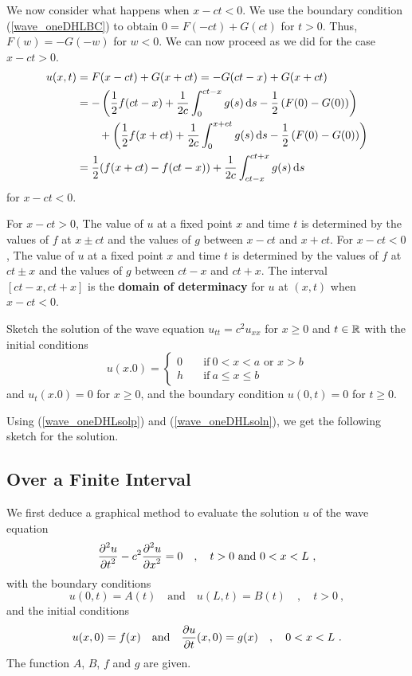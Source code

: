 We now consider what happens when $x-ct <0$.  We use the boundary
condition (\ref{wave_oneDHLBC}) to obtain $0 = F(-ct) + G(ct)$ for
$t>0$.  Thus, $F(w) = -G(-w)$ for $w<0$.  We can now proceed as we did
for the case $x-ct>0$.
\begin{align}
u(x,t) &= F(x-ct) + G(x+ct) = -G(ct-x) + G(x+ct) \nonumber \\
&= -\left( \frac{1}{2} f(ct-x) + \frac{1}{2c} \int_0^{ct-x} g(s)\,\mathrm{d}{s} -
\frac{1}{2} \left(F(0) - G(0)\right) \right) \nonumber \\
&\qquad + \left( \frac{1}{2} f(x+ct) + \frac{1}{2c} \int_0^{x+ct} g(s)\,\mathrm{d}{s}
 - \frac{1}{2} \left(F(0) - G(0)\right) \right) \nonumber \\
&= \frac{1}{2} (f(x+ct) - f(ct-x)) + \frac{1}{2c}
\int_{ct-x}^{ct+x} g(s) \,\mathrm{d}{s}
\label{wave_oneDHLsoln}
\end{align}
for $x-ct < 0$.

For $x-ct>0$, The value of $u$ at a fixed point $x$ and time $t$ is
determined by the values of $f$ at $x\pm ct$ and the values of $g$
between $x-ct$ and $x+ct$.  For $x-ct<0$, The value of $u$ at a fixed
point $x$ and time $t$ is determined by the values of $f$ at $ct\pm x$
and the values of $g$ between $ct-x$ and $ct+x$.  The interval
$[ct-x,ct+x]$ is the {\bfseries domain of determinacy}%
 for $u$ at
$(x,t)$ when $x-ct <0$.

\begin{egg}
Sketch the solution of the wave equation $\displaystyle u_{tt} = c^2 u_{xx}$ for
$x\geq 0$ and $t \in \mathbb{R}$ with the initial conditions
\[
u(x.0) = \begin{cases}
0 & \quad \text{if} \ 0<x<a \text{ or } x >b \\
h & \quad \text{if} \ a\leq x \leq b
\end{cases}
\]
and $u_t(x.0) = 0$ for $x \geq 0$, and the boundary condition
$u(0,t) = 0$ for $t \geq 0$.

Using (\ref{wave_oneDHLsolp}) and (\ref{wave_oneDHLsoln}), we get the
following sketch for the solution.
\begin{center}
\end{center}
\end{egg}

\subsection{Over a Finite Interval}

We first deduce a graphical method to evaluate the solution $u$
of the wave equation
\[
\frac{\displaystyle \partial^{2}{u}} {\displaystyle \partial t^{2}} - c^2 \frac{\displaystyle \partial^{2}{u}} {\displaystyle \partial x^{2}} = 0 \quad , \quad t>0
\text{ and } 0<x<L \ ,
\]
with the boundary conditions
\[
u(0,t) = A(t) \quad \text{and} \quad u(L,t) = B(t) \quad , \quad t>0 \ ,
\]
and the initial conditions
\[
u(x,0) = f(x) \quad \text{and} \quad \frac{\partial{u}}{\partial t}(x,0) = g(x) \quad ,
\quad 0 < x < L \ .
\]
The function $A$, $B$, $f$ and $g$ are given.


